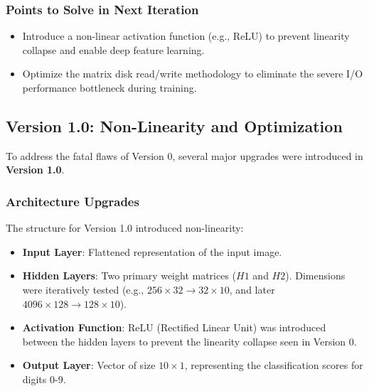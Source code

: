 \documentclass[12pt,a4paper]{article}
\begin{document}
\subsubsection{Points to Solve in Next Iteration}
\begin{itemize}
    \item Introduce a non-linear activation function (e.g., ReLU) to prevent linearity collapse and enable deep feature learning.
    \item Optimize the matrix disk read/write methodology to eliminate the severe I/O performance bottleneck during training.
\end{itemize}

\subsection{Version 1.0: Non-Linearity and Optimization}
To address the fatal flaws of Version 0, several major upgrades were introduced in \textbf{Version 1.0}.

\subsubsection{Architecture Upgrades}
The structure for Version 1.0 introduced non-linearity:
\begin{itemize}
    \item \textbf{Input Layer}: Flattened representation of the input image.
    \item \textbf{Hidden Layers}: Two primary weight matrices ($H1$ and $H2$). Dimensions were iteratively tested (e.g., $256 \times 32 \to 32 \times 10$, and later $4096 \times 128 \to 128 \times 10$).
    \item \textbf{Activation Function}: ReLU (Rectified Linear Unit) was introduced between the hidden layers to prevent the linearity collapse seen in Version 0.
    \item \textbf{Output Layer}: Vector of size $10 \times 1$, representing the classification scores for digits 0-9.
\end{itemize}
\end{document}
